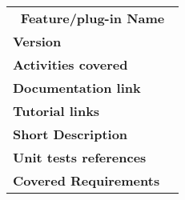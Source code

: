 
\begin{tabular}{|lp{}|}
\hline
\multicolumn{2}{|c|}{\bf Feature/plug-in Name}\\
\bf Version&\\
\bf Activities covered&\\
\bf Documentation link&\\
\bf Tutorial links&\\
\bf Short Description&\\
\bf Unit tests references&\\
\bf Covered Requirements&\\
\hline
\end{tabular}





